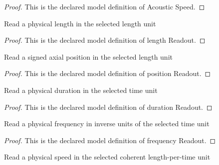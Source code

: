 \begin{proof}
  This is the declared model definition of Acoustic Speed.
\end{proof}
\begin{definition}
  \label{def:physics:phyx-mini-0211:phyxminiproblems-problemphyxmini0211-lengthreadout}
  Read a physical length in the selected length unit
\end{definition}
\begin{proof}
  This is the declared model definition of length Readout.
\end{proof}
\begin{definition}
  \label{def:physics:phyx-mini-0211:phyxminiproblems-problemphyxmini0211-positionreadout}
  Read a signed axial position in the selected length unit
\end{definition}
\begin{proof}
  This is the declared model definition of position Readout.
\end{proof}
\begin{definition}
  \label{def:physics:phyx-mini-0211:phyxminiproblems-problemphyxmini0211-durationreadout}
  Read a physical duration in the selected time unit
\end{definition}
\begin{proof}
  This is the declared model definition of duration Readout.
\end{proof}
\begin{definition}
  \label{def:physics:phyx-mini-0211:phyxminiproblems-problemphyxmini0211-frequencyreadout}
  Read a physical frequency in inverse units of the selected time unit
\end{definition}
\begin{proof}
  This is the declared model definition of frequency Readout.
\end{proof}
\begin{definition}
  \label{def:physics:phyx-mini-0211:phyxminiproblems-problemphyxmini0211-speedreadout}
  Read a physical speed in the selected coherent length-per-time unit
\end{definition}
